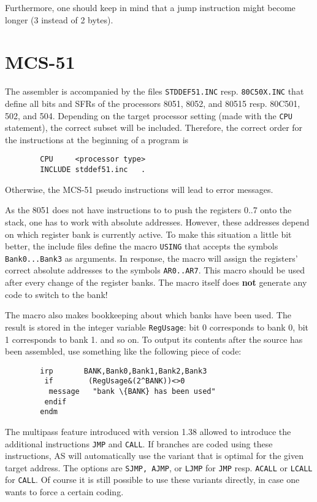\documentclass[12pt,twoside]{report}
\newcommand{\bb}[1]{{\bf #1}}
\newcommand{\tty}[1]{{\tt #1}}
\begin{document}
Furthermore, one should keep in mind that a jump instruction might
become longer (3 instead of 2 bytes).


\section{MCS-51}

The assembler is accompanied by the files \tty{STDDEF51.INC} resp.
\tty{80C50X.INC} that define all bits and SFRs of the processors 8051,
8052, and 80515 resp. 80C501, 502, and 504.  Depending on the target
processor setting (made with the \tty{CPU} statement), the correct subset
will be included.  Therefore, the correct order for the instructions
at the beginning of a program is
\begin{verbatim}
        CPU     <processor type>
        INCLUDE stddef51.inc   .
\end{verbatim}
Otherwise, the MCS-51 pseudo instructions will lead to error
messages.

As the 8051 does not have instructions to to push the registers 0..7
onto the stack, one has to work with absolute addresses.  However,
these addresses depend on which register bank is currently active.
To make this situation a little bit better, the include files define
the macro \tty{USING} that accepts the symbols \tty{Bank0...Bank3} as arguments.
In response, the macro will assign the registers' correct absolute
addresses to the symbols \tty{AR0..AR7}.  This macro should be used after
every change of the register banks.  The macro itself does \bb{not}
generate any code to switch to the bank!

The macro also makes bookkeeping about which banks have been used.
The result is stored in the integer variable \tty{RegUsage}: bit 0
corresponds to bank 0, bit 1 corresponds to bank 1. and so on.  To
output its contents after the source has been assembled, use
something like the following piece of code:
\begin{verbatim}
        irp       BANK,Bank0,Bank1,Bank2,Bank3
         if        (RegUsage&(2^BANK))<>0
          message   "bank \{BANK} has been used"
         endif
        endm
\end{verbatim}
The multipass feature introduced with version 1.38 allowed to introduce
the additional instructions \tty{JMP} and \tty{CALL}.  If branches are
coded using these instructions, AS will automatically use the variant that
is optimal for the given target address.  The options are \tty{SJMP,
AJMP}, or \tty{LJMP} for \tty{JMP} resp. \tty{ACALL} or \tty{LCALL} for
\tty{CALL}.  Of course it is still possible to use these variants
directly, in case one wants to force a certain coding.
\end{document}
